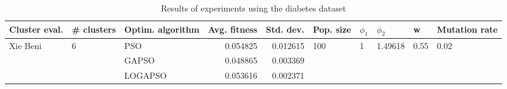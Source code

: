 \begin{table}
\centering
\caption{Results of experiments using the diabetes dataset}
\begin{tabular}{lllrrlllll}
\toprule
            Cluster eval. &        \# clusters & Optim. algorithm &  Avg. fitness &  Std. dev. &            Pop. size &         $\phi_{1}$ &               $\phi_{2}$ &                     w &         Mutation rate \\
\midrule
\multirow{3}{*}{Xie Beni} & \multirow{3}{*}{6} &              PSO &      0.054825 &   0.012615 & \multirow{3}{*}{100} & \multirow{3}{*}{1} & \multirow{3}{*}{1.49618} & \multirow{3}{*}{0.55} & \multirow{3}{*}{0.02} \\
                          &                    &            GAPSO &      0.048865 &   0.003369 &                      &                    &                          &                       &                       \\
                          &                    &          LOGAPSO &      0.053616 &   0.002371 &                      &                    &                          &                       &                       \\
\bottomrule
\end{tabular}
\end{table}
